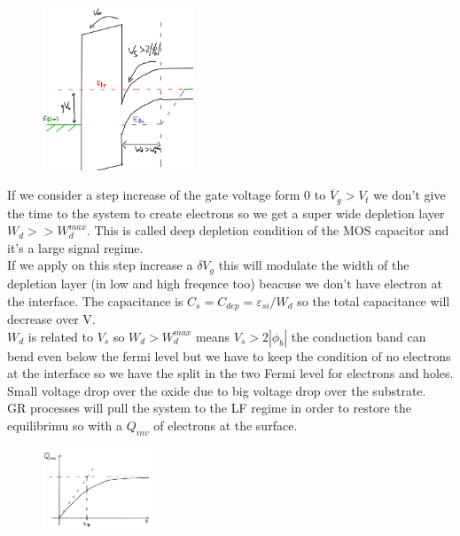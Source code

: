 \begin{figure}
\includegraphics[width=0.4\textwidth]{ddcond.png}
\end{figure}

If we consider a step increase of the gate voltage form 0 to $\overline{V}_g>V_t$ we don't give the time to the system to create electrons so we get a super wide depletion layer $W_d>>W_d^{max}$. This is called deep depletion condition of the MOS capacitor and it's a large signal regime.\\
If we apply on this step increase a $\delta V_g$ this will modulate the width of the depletion layer (in low and high freqence too) beacuse we don't have electron at the interface. The capacitance is $C_s=C_{dep}=\varepsilon_{si}/W_d$ so the total capacitance will decrease over V.\\
$W_d$ is related to $V_s$ so $W_d>W_d^{max}$ means $V_s>2|\phi_b|$ the conduction band can bend even below the fermi level but we have to keep the condition of no electrons at the interface so we have the split in the two Fermi level for electrons and holes. Small voltage drop over the oxide due to big voltage drop over the substrate.\\
GR processes will pull the system to the LF regime in order to restore the equilibrimu so with a $Q_{inv}$ of electrons at the surface.\\

\begin{figure}
\includegraphics[width=0.3\textwidth]{qinv.png}
\end{figure}


